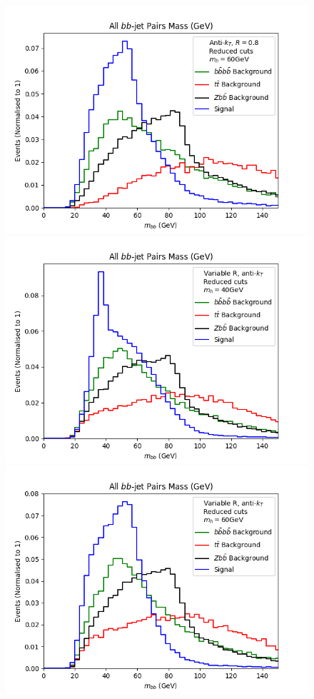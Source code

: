 \documentclass[12pt]{article}
\begin{document}
\begin{figure}[t!]
    \includegraphics[scale=0.5]{plots/background/bb_mass_all_pairs_60gev_AK8.png}
    \includegraphics[scale=0.5]{plots/background/bb_mass_all_pairs_40gev_rho20.png}
    \includegraphics[scale=0.5]{plots/background/bb_mass_all_pairs_60gev_rho20.png}

\end{figure}
\end{document}
